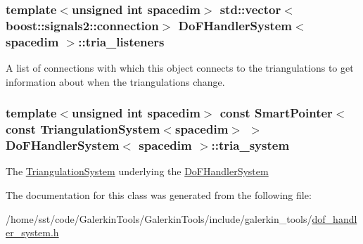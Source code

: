\subsubsection[{\texorpdfstring{tria\+\_\+listeners}{tria_listeners}}]{\setlength{\rightskip}{0pt plus 5cm}template$<$unsigned int spacedim$>$ std\+::vector$<$boost\+::signals2\+::connection$>$ {\bf Do\+F\+Handler\+System}$<$ spacedim $>$\+::tria\+\_\+listeners\hspace{0.3cm}{\ttfamily [private]}}\hypertarget{class_do_f_handler_system_a286776a935dacb3d1c79a90f4ca7e5d8}{}\label{class_do_f_handler_system_a286776a935dacb3d1c79a90f4ca7e5d8}
A list of connections with which this object connects to the triangulations to get information about when the triangulations change. 
\subsubsection[{\texorpdfstring{tria\+\_\+system}{tria_system}}]{\setlength{\rightskip}{0pt plus 5cm}template$<$unsigned int spacedim$>$ const {\bf Smart\+Pointer}$<$const {\bf Triangulation\+System}$<$spacedim$>$ $>$ {\bf Do\+F\+Handler\+System}$<$ spacedim $>$\+::tria\+\_\+system\hspace{0.3cm}{\ttfamily [private]}}\hypertarget{class_do_f_handler_system_a06d93193cb47591db138cd8f41953796}{}\label{class_do_f_handler_system_a06d93193cb47591db138cd8f41953796}
The \hyperlink{class_triangulation_system}{Triangulation\+System} underlying the \hyperlink{class_do_f_handler_system}{Do\+F\+Handler\+System} 

The documentation for this class was generated from the following file\+:\begin{DoxyCompactItemize}
\item 
/home/sst/code/\+Galerkin\+Tools/\+Galerkin\+Tools/include/galerkin\+\_\+tools/\hyperlink{dof__handler__system_8h}{dof\+\_\+handler\+\_\+system.\+h}\end{DoxyCompactItemize}
